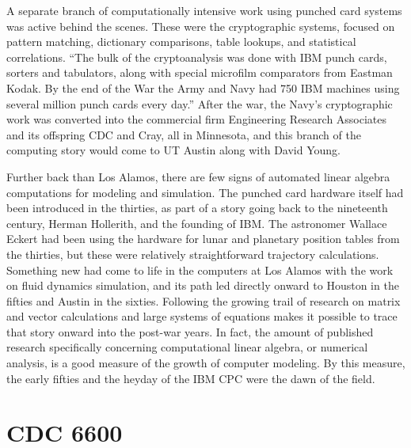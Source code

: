 A separate branch of computationally intensive work using punched card systems was active behind the scenes. These were the cryptographic systems, focused on pattern matching, dictionary comparisons, table lookups, and statistical correlations. ``The bulk of the cryptoanalysis was done with IBM punch cards, sorters and tabulators, along with special microfilm comparators from Eastman Kodak. By the end of the War the Army and Navy had 750 IBM machines using several million punch cards every day.'' After the war, the Navy's cryptographic work was converted into the commercial firm Engineering Research Associates and its offspring CDC and Cray, all in Minnesota, and this branch of the computing story would come to UT Austin along with David Young. \cite{blankSecretHistoryMinnesota2023}

Further back than Los Alamos, there are few signs of automated linear algebra computations for modeling and simulation. The punched card hardware itself had been introduced in the thirties, as part of a story going back to the nineteenth century, Herman Hollerith, and the founding of IBM. The astronomer Wallace Eckert had been using the hardware for lunar and planetary position tables from the thirties, but these were relatively straightforward trajectory calculations. Something new had come to life in the computers at Los Alamos with the work on fluid dynamics simulation, and its path led directly onward to Houston in the fifties and Austin in the sixties. Following the growing trail of research on matrix and vector calculations and large systems of equations makes it possible to trace that story onward into the post-war years. In fact, the amount of published research specifically concerning computational linear algebra, or numerical analysis, is a good measure of the growth of computer modeling. By this measure, the early fifties and the heyday of the IBM CPC were the dawn of the field.

\section{CDC 6600}

